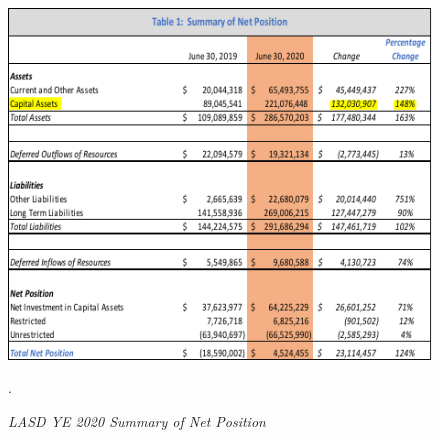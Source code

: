 \begin{figure}
  \centering
  \caption[LASD YE 2020 Summary of Net Position]{\textit{LASD YE 2020 Summary of Net Position}}\label{fig:net-position}
  \includegraphics[width=\textwidth]{CAFR-YE2020_Summary_of_Net_Position}\\
  \footnotesize\raggedright\textcite[6]{Kenyon2021}.
\end{figure}

